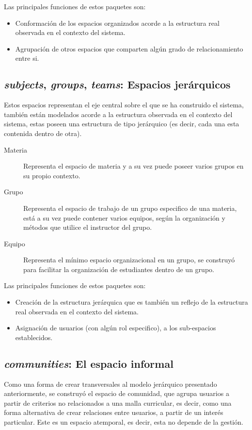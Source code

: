 Las principales funciones de estos paquetes son:

\begin{itemize}
\item Conformación de los espacios organizados acorde a la estructura real
observada en el contexto del sistema.
\item Agrupación de otros espacios que comparten algún grado de relacionamiento
entre si.
\end{itemize}

\subsection{\emph{subjects}, \emph{groups}, \emph{teams}: Espacios jerárquicos}
Estos espacios representan el eje central sobre el que se ha construido el
sistema, también están modelados acorde a la estructura observada en el contexto
del sistema, estas poseen una estructura de tipo jerárquico (es decir, cada una
esta contenida dentro de otra).

\begin{description}
\item [Materia] Representa el espacio de materia y a su vez puede poseer varios
grupos en su propio contexto.
\item [Grupo] Representa el espacio de trabajo de un grupo especifico de una
materia, está a su vez puede contener varios equipos, según la organización y
métodos que utilice el instructor del grupo.
\item [Equipo] Representa el mínimo espacio organizacional en un grupo, se
construyó para facilitar la organización de estudiantes dentro de un grupo.
\end{description}

Las principales funciones de estos paquetes son:

\begin{itemize}
\item Creación de la estructura jerárquica que es también un reflejo de la
estructura real observada en el contexto del sistema.
\item Asignación de usuarios (con algún rol especifico), a los sub-espacios
establecidos.
\end{itemize}

\subsection{\emph{communities}: El espacio informal}
Como una forma de crear transversales al modelo jerárquico presentado
anteriormente, se construyó el espacio de comunidad, que agrupa usuarios a
partir de criterios no relacionados a una malla curricular, es decir, como una
forma alternativa de crear relaciones entre usuarios, a partir de un interés
particular. Este es un espacio atemporal, es decir, esta no depende de la
gestión.

